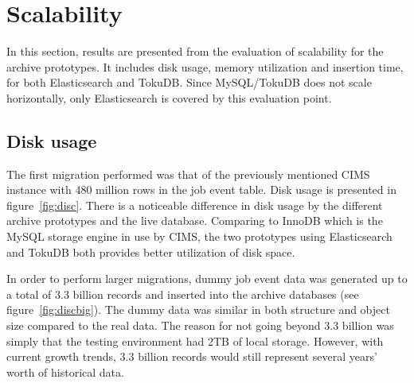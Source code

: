 

\section{Scalability}
In this section, results are presented from the evaluation of scalability for the archive prototypes. It includes disk usage, memory utilization and insertion time, for both Elasticsearch and TokuDB. Since MySQL/TokuDB does not scale horizontally, only Elasticsearch is covered by this evaluation point.

\subsection{Disk usage}
The first migration performed was that of the previously mentioned CIMS instance with 480 million rows in the job event table. Disk usage is presented in figure~\ref{fig:disc}. There is a noticeable difference in disk usage by the different archive prototypes and the live database. Comparing to InnoDB which is the MySQL storage engine in use by CIMS, the two prototypes using Elasticsearch and TokuDB both provides better utilization of disk space.

In order to perform larger migrations, dummy job event data was generated up to a total of 3.3 billion records and inserted into the archive databases (see figure~\ref{fig:discbig}). The dummy data was similar in both structure and object size compared to the real data. The reason for not going beyond 3.3 billion was simply that the testing environment had 2TB of local storage. However, with current growth trends, 3.3 billion records would still represent several years' worth of historical data.


